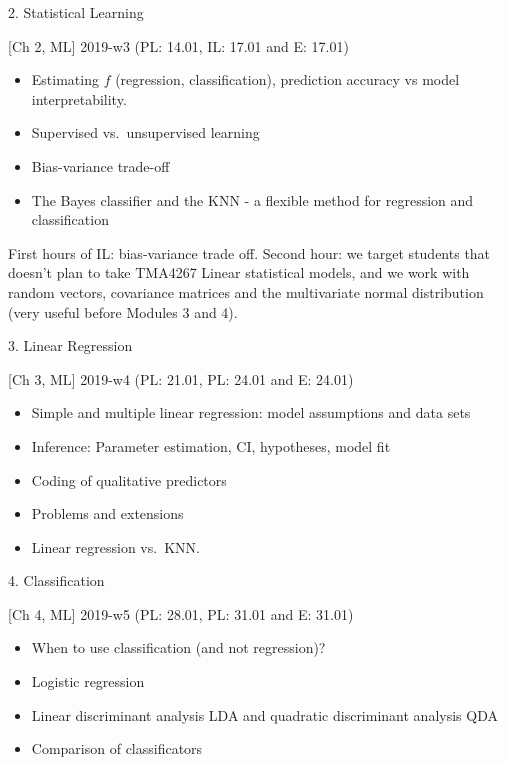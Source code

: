\documentclass[10pt,ignorenonframetext,]{beamer}
\providecommand{\tightlist}{%
  \setlength{\itemsep}{0pt}\setlength{\parskip}{0pt}}
\begin{document}
\begin{frame}

\begin{block}{2. Statistical Learning}

{[}Ch 2, ML{]} 2019-w3 (PL: 14.01, IL: 17.01 and E: 17.01)

\begin{itemize}
\tightlist
\item
  Estimating \(f\) (regression, classification), prediction accuracy vs
  model interpretability.
\item
  Supervised vs.~unsupervised learning
\item
  Bias-variance trade-off
\item
  The Bayes classifier and the KNN - a flexible method for regression
  and classification
\end{itemize}

First hours of IL: bias-variance trade off. Second hour: we target
students that doesn't plan to take TMA4267 Linear statistical models,
and we work with random vectors, covariance matrices and the
multivariate normal distribution (very useful before Modules 3 and 4).

\end{block}

\end{frame}

\begin{frame}

\begin{block}{3. Linear Regression}

{[}Ch 3, ML{]} 2019-w4 (PL: 21.01, PL: 24.01 and E: 24.01)

\begin{itemize}
\tightlist
\item
  Simple and multiple linear regression: model assumptions and data sets
\item
  Inference: Parameter estimation, CI, hypotheses, model fit
\item
  Coding of qualitative predictors
\item
  Problems and extensions
\item
  Linear regression vs.~KNN.
\end{itemize}

\end{block}

\begin{block}{4. Classification}

{[}Ch 4, ML{]} 2019-w5 (PL: 28.01, PL: 31.01 and E: 31.01)

\begin{itemize}
\tightlist
\item
  When to use classification (and not regression)?
\item
  Logistic regression
\item
  Linear discriminant analysis LDA and quadratic discriminant analysis
  QDA
\item
  Comparison of classificators
\end{itemize}

\end{block}

\end{frame}
\end{document}

